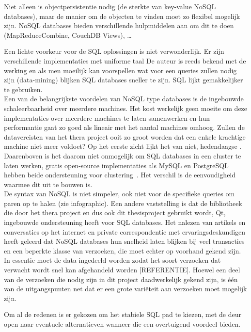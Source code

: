Niet alleen is objectpersistentie nodig (de sterkte van key-value NoSQL databases), maar de manier om de objecten te vinden moet zo flexibel mogelijk zijn. NoSQL databases bieden verschillende hulpmiddelen aan om dit te doen (MapReduceCombine, CouchDB Views), \ldots 

Een lichte voorkeur voor de SQL oplossingen is niet verwonderlijk. Er zijn verschillende implementaties met uniforme taal De auteur is reeds bekend met de werking en als men moeilijk kan voorspellen wat voor een queries zullen nodig zijn (data-mining) blijken SQL databases sneller te zijn. SQL lijkt gemakkelijker te gebruiken.\\

Een van de belangrijkste voordelen van NoSQL type databases is de ingebouwde schaleerbaarheid over meerdere machines. Het kost werkelijk geen moeite om deze implementaties over meerdere machines te laten samenwerken en hun performantie gaat zo goed als lineair met het aantal machines omhoog. Zullen de datavereisten van het thera project ooit zo groot worden dat een enkele krachtige machine niet meer voldoet? Op het eerste zicht lijkt het van niet, hedendaagse . Daarenboven is het daarom niet onmogelijk om SQL databases in een cluster te laten werken, gratis open-source implementaties als MySQL en PostgreSQL hebben beide ondersteuning voor clustering~\cite{postgrescluster, mysqlcluster}. Het verschil is de eenvoudigheid waarmee dit uit te bouwen is.\\

De syntax van NoSQL is niet simpeler, ook niet voor de specifieke queries om paren op te halen (zie infographic). Een andere vaststelling is dat de bibliotheek die door het thera project en dus ook dit thesisproject gebruikt wordt, Qt, ingebouwde ondersteuning heeft voor SQL databases. Het nalezen van artikels en conversaties op het internet en private correspondentie met ervaringsdeskundigen heeft geleerd dat NoSQL databases hun snelheid laten blijken bij veel transacties en een beperkte klasse van verzoeken, die moet echter op voorhand gekend zijn. In essentie moet de data ingedeeld worden zodat het soort verzoeken dat verwacht wordt snel kan afgehandeld worden [REFERENTIE]. Hoewel een deel van de verzoeken die nodig zijn in dit project daadwerkelijk gekend zijn, is \'e\'en van de uitgangspunten net dat er een grote vari\"eteit aan verzoeken moet mogelijk zijn.  

Om al de redenen is er gekozen om het stabiele SQL pad te kiezen, met de deur open naar eventuele alternatieven wanneer die een overtuigend voordeel bieden.

